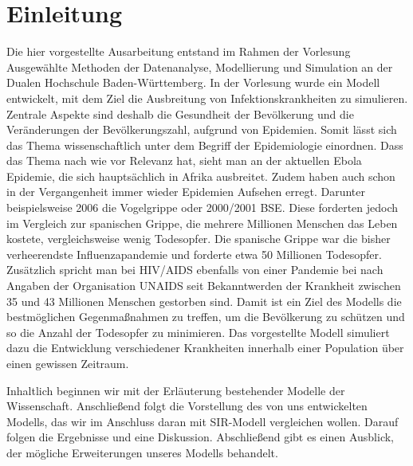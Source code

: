 \section*{Einleitung}

Die hier vorgestellte Ausarbeitung entstand im Rahmen der Vorlesung \glqq Ausgewählte Methoden der Datenanalyse, Modellierung und Simulation\grqq\; an der Dualen Hochschule Baden-Württemberg.
In der Vorlesung wurde ein Modell entwickelt, mit dem Ziel die Ausbreitung von Infektionskrankheiten zu simulieren.
Zentrale Aspekte sind deshalb die Gesundheit der Bevölkerung und die Veränderungen der Bevölkerungszahl, aufgrund von Epidemien. Somit lässt sich das Thema wissenschaftlich unter dem Begriff der Epidemiologie einordnen.
Dass das Thema nach wie vor Relevanz hat, sieht man an der aktuellen Ebola Epidemie, die sich hauptsächlich in Afrika ausbreitet. Zudem haben auch schon in der Vergangenheit immer wieder Epidemien Aufsehen erregt. Darunter beispielsweise 2006 die Vogelgrippe\cite{gehlhoff2007chronik}
oder 2000/2001 BSE\cite{Spon:2014}. Diese forderten jedoch im Vergleich zur spanischen Grippe, die mehrere Millionen Menschen das Leben kostete, vergleichsweise wenig Todesopfer. Die spanische Grippe war die bisher verheerendste Influenzapandemie und forderte etwa 50 Millionen Todesopfer\cite{welt:2014}. Zusätzlich spricht man bei HIV/AIDS ebenfalls von einer Pandemie bei nach Angaben der Organisation UNAIDS seit Bekanntwerden der Krankheit zwischen 35 und 43 Millionen Menschen gestorben sind\cite{UNAIDS:2014}.
Damit ist ein Ziel des Modells die bestmöglichen Gegenmaßnahmen zu treffen, um die Bevölkerung zu schützen und so die Anzahl der Todesopfer zu minimieren.
Das vorgestellte Modell simuliert dazu die Entwicklung verschiedener Krankheiten innerhalb einer Population über einen gewissen Zeitraum. 
\smallskip

Inhaltlich beginnen wir mit der Erläuterung bestehender Modelle der Wissenschaft. Anschließend folgt die Vorstellung des von uns entwickelten Modells, das wir im Anschluss daran mit SIR-Modell vergleichen wollen. Darauf folgen die Ergebnisse und eine Diskussion. Abschließend gibt es einen Ausblick, der mögliche Erweiterungen unseres Modells behandelt. 

